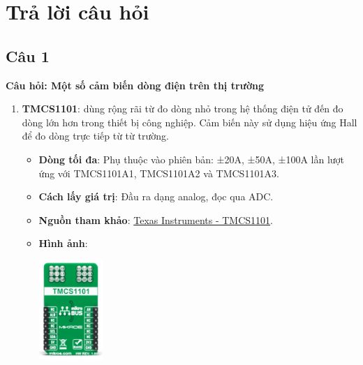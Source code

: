 \section{Trả lời câu hỏi}
\subsection{Câu 1}
\textbf{Câu hỏi: Một số cảm biến dòng điện trên thị trường}

\begin{enumerate}
    \item \textbf{TMCS1101}: dùng rộng rãi từ đo dòng nhỏ trong hệ thống điện tử đến đo dòng lớn hơn trong thiết bị công nghiệp. Cảm biến này sử dụng hiệu ứng Hall để đo dòng trực tiếp từ từ trường.
    \begin{itemize}
        \item \textbf{Dòng tối đa}: Phụ thuộc vào phiên bản: ±20A, ±50A, ±100A lần lượt ứng với TMCS1101A1, TMCS1101A2 và TMCS1101A3.
        \item \textbf{Cách lấy giá trị}: Đầu ra dạng analog, đọc qua ADC.
        \item \textbf{Nguồn tham khảo}: \href{https://www.ti.com/product/TMCS1101}{Texas Instruments - TMCS1101}.
        \item \textbf{Hình ảnh}:
        \begin{center}
            \includegraphics[width=0.2\textwidth]{graphics/section5/tmcs1101.png}
        \end{center}
    \end{itemize}


\end{enumerate}
